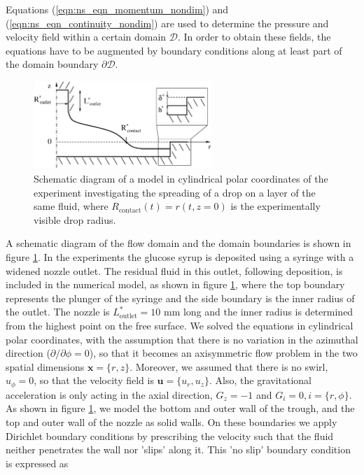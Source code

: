 \documentclass[aip,graphicx]{revtex4-1}
\newcommand{\sym}[1]{\text{#1}} \newcommand{\dif}{\mathrm{d}}
\newcommand{\vect}[1]{\bm{#1}}
\begin{document}
Equations (\ref{eqn:ns_eqn_momentum_nondim}) and
(\ref{eqn:ns_eqn_continuity_nondim}) are used to determine the
pressure and velocity field within a certain domain $\mathcal{D}$.  In
order to obtain these fields, the equations have to be augmented by
boundary conditions along at least part of the domain boundary
$\partial \mathcal{D}$.

\begin{figure}[!ht]
\centering
\includegraphics[width=0.6\textwidth]{figures/axisym_drop_nozzle_gap_computation.eps}
\caption{Schematic diagram of a model in cylindrical polar coordinates
  of the experiment investigating the spreading of a drop on a layer
  of the same fluid, where $R_{\sym{contact}}(t)=r(t,z=0)$ is the
  experimentally visible drop radius.}
\label{fig:axisym_drop_nozzle}
\end{figure}

A schematic diagram of the flow domain and the domain boundaries is
shown in figure \ref{fig:axisym_drop_nozzle}.  In the experiments the
glucose syrup is deposited using a syringe with a widened nozzle
outlet.  The residual fluid in this outlet, following deposition, is
included in the numerical model, as shown in figure
\ref{fig:axisym_drop_nozzle}, where the top boundary represents the
plunger of the syringe and the side boundary is the inner radius of
the outlet.  The nozzle is $L^*_{\sym{outlet}}=10$ mm long and the
inner radius is determined from the highest point on the free surface.
We solved the equations in cylindrical polar coordinates, with the
assumption that there is no variation in the azimuthal direction
($\partial / \partial \phi = 0$), so that it becomes an axisymmetric
flow problem in the two spatial dimensions $\vect{x}=\{r,z\}$.
Moreover, we assumed that there is no swirl, $u_{\phi}=0$, so that the
velocity field is $\vect{u}=\{u_r,u_z\}$.  Also, the gravitational
acceleration is only acting in the axial direction, $G_z = -1$ and
$G_i=0, i = \{ r,\phi \}$.  As shown in figure
\ref{fig:axisym_drop_nozzle}, we model the bottom and outer wall of
the trough, and the top and outer wall of the nozzle as solid walls.
On these boundaries we apply Dirichlet boundary conditions by
prescribing the velocity such that the fluid neither penetrates the
wall nor 'slips' along it.  This 'no slip' boundary condition is
expressed as
\end{document}

